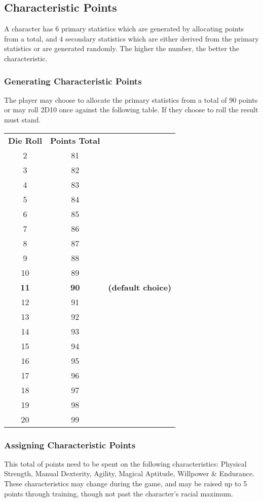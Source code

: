 \begin{multicols*}{3}
\subsection{Characteristic Points}
\label{chargen:points}

A character has 6 primary statistics which are generated by allocating
points from a total, and 4 secondary statistics which are either
derived from the primary statistics or are generated randomly. The
higher the number, the better the characteristic.

\subsubsection{Generating Characteristic Points}

The player may choose to allocate the primary statistics from a total
of 90 points or may roll 2D10 once against the following table. If
they choose to roll the result must stand.

\begin{tabular}{ccl}
\textbf{Die Roll} & \textbf{Points Total} \\
2	& 81 \\
3	& 82 \\
4	& 83 \\
5	& 84 \\
6	& 85 \\
7	& 86 \\
8	& 87 \\
9	& 88 \\
10	& 89 \\
\textbf{11} & \textbf{90} & \textbf{(default choice)} \\
12	& 91 \\
13	& 92 \\
14	& 93 \\
15	& 94 \\
16	& 95 \\
17	& 96 \\
18	& 97 \\
19	& 98 \\
20	& 99 \\
\end{tabular}

\subsubsection{Assigning Characteristic Points}

This total of points need to be spent on the following
characteristics: Physical Strength, Manual Dexterity, Agility, Magical
Aptitude, Willpower \& Endurance. These characteristics may change
during the game, and may be raised up to 5 points through training,
though not past the character's racial maximum.


\end{multicols*}
